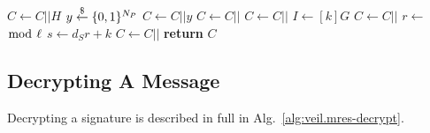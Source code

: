 \begin{algorithm}[ht]
\begin{algorithmic}
                \State $C \gets C||H$
            \EndFor
            \State
            \State $y \stackrel{\$}{\gets} \{0,1\}^{N_P}$
            \State {}
            \State $C \gets C||y$
            \State
            \State {}
                \State $C \gets C||$
                \State $C \gets C||$
                \State {}
            \EndFor
            \State
            \State $I \gets [k]G$
            \State $C \gets C||$
            \State
            \State $r \gets$  $\bmod~\ell$\label{alg:veil.mres-encrypt-challenge}
            \State $s \gets {d_S}r + k$
            \State $C \gets C||$
            \State \textbf{return} $C$
        \EndFunction
    \end{algorithmic}
    \label{alg:veil.mres-encrypt}
\end{algorithm}

\subsection{Decrypting A Message}\label{subsec:veil.mres-decrypt}

Decrypting a signature is described in full in Alg.~\ref{alg:veil.mres-decrypt}.

